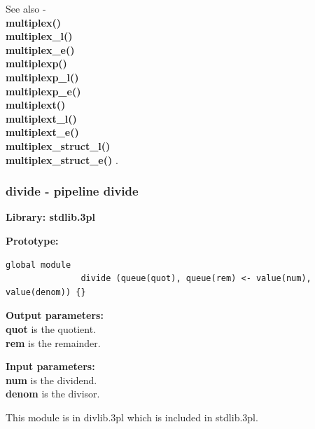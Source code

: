             
            See also - \\
            {\bf multiplex()}  \\
            {\bf multiplex\_l()}  \\
            {\bf multiplex\_e()}  \\
            {\bf multiplexp()}  \\
            {\bf multiplexp\_l()}  \\
            {\bf multiplexp\_e()}  \\
            {\bf multiplext()}  \\
            {\bf multiplext\_l()}  \\
            {\bf multiplext\_e()}  \\
            {\bf multiplex\_struct\_l()}  \\
            {\bf multiplex\_struct\_e()} .



        \subsubsection{divide - pipeline divide}\label{sec:lmdivide}

            {\bf Library: stdlib.3pl}

            {\bf Prototype:} \\
            \vsp
            \begin{lstlisting}[gobble=12, language=threepl]
               global module
               divide (queue(quot), queue(rem) <- value(num), value(denom)) {}
            \end{lstlisting}

            {\bf Output parameters:} \\
            {\bf quot} is the quotient.\\
            {\bf rem} is the remainder.

            {\bf Input parameters:} \\
            {\bf num} is the dividend.\\
            {\bf denom} is the divisor.
            
            This module is in divlib.3pl which is included in stdlib.3pl.

